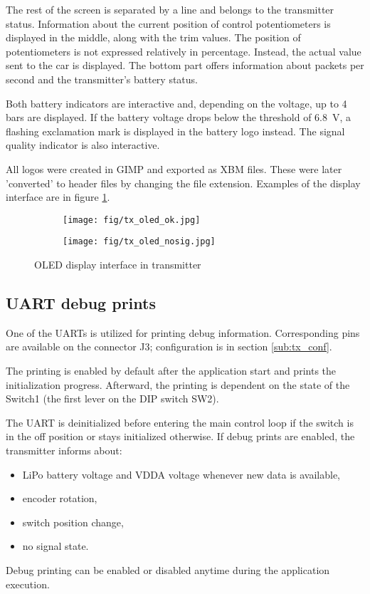The rest of the screen is separated by a line and belongs to the transmitter status. Information about the current position of control potentiometers is displayed in the middle, along with the trim values. The position of potentiometers is not expressed relatively in percentage. Instead, the actual value sent to the car is displayed. The bottom part offers information about packets per second and the transmitter's battery status.

Both battery indicators are interactive and, depending on the voltage, up to 4 bars are displayed. If the battery voltage drops below the threshold of \SI{6.8}{\V}, a flashing exclamation mark is displayed in the battery logo instead. The signal quality indicator is also interactive.

All logos were created in GIMP and exported as XBM files. These were later 'converted' to header files by changing the file extension. Examples of the display interface are in figure \ref{fig:tx_oled}.
\begin{figure}[t]
    \centering
    \begin{subfigure}{0.35\textwidth}
    \centering
        \texttt{[image: fig/tx\_oled\_ok.jpg]}
    \end{subfigure}%
    \hspace{1cm}
    \begin{subfigure}{0.35\textwidth}
    \centering
		\texttt{[image: fig/tx\_oled\_nosig.jpg]}
    \end{subfigure}
	\caption{OLED display interface in transmitter}
    \label{fig:tx_oled}
\end{figure}

\subsection{UART debug prints}
One of the UARTs is utilized for printing debug information. Corresponding pins are available on the connector J3; configuration is in section \ref{sub:tx_conf}.

The printing is enabled by default after the application start and prints the initialization progress. Afterward, the printing is dependent on the state of the Switch1 (the first lever on the DIP switch SW2).

The UART is deinitialized before entering the main control loop if the switch is in the off position or stays initialized otherwise. If debug prints are enabled, the transmitter informs about:
\begin{itemize}
\item LiPo battery voltage and VDDA voltage whenever new data is available,
\item encoder rotation,
\item switch position change,
\item no signal state.
\end{itemize}
Debug printing can be enabled or disabled anytime during the application execution.



